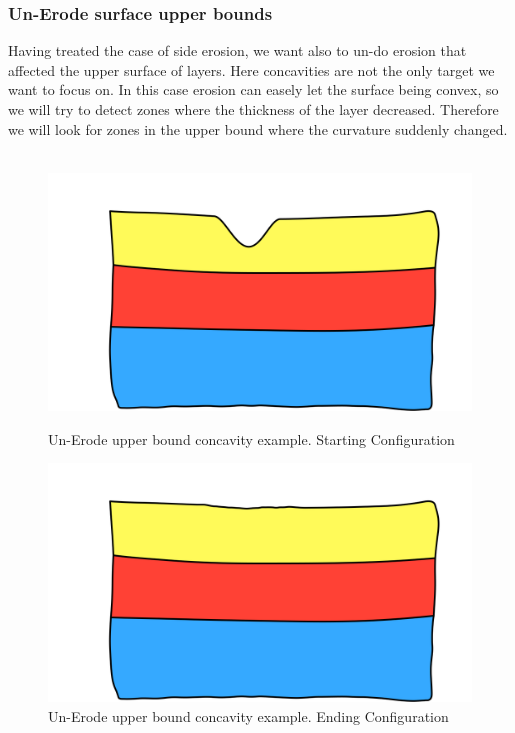 \documentclass[12pt, a4paper]{report} %
\begin{document}
\subsubsection{Un-Erode surface upper bounds}
\label{sub:convavepart}
Having treated the case of side erosion, we want also to un-do erosion that affected the upper surface of layers. Here concavities are not the only target we want to focus on. In this case erosion can easely let the surface being convex, so we will try to detect zones where the thickness of the layer decreased. Therefore we will look for zones in the upper bound where the curvature suddenly changed.\\\\
\begin{figure}[h]
    \begin{minipage}[c]{.46\linewidth}
        \centering
        \includegraphics[scale=0.2]{unErodeUpDescription0.png}
	\caption{Un-Erode upper bound concavity example. Starting Configuration}
    \end{minipage}
    \hfill%
    \begin{minipage}[c]{.46\linewidth}
        \centering
        \includegraphics[scale=0.2]{unErodeUpDescription1.png}
	\caption{Un-Erode upper bound concavity example. Ending Configuration}
    \end{minipage}
\end{figure}\\
\end{document}
